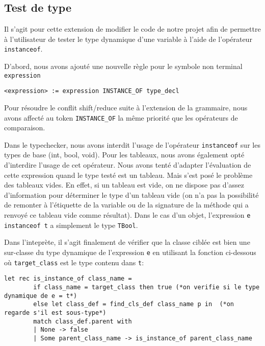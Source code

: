 \documentclass{article}
\begin{document}
\subsection{Test de type}
Il s'agit pour cette extension de modifier le code de notre projet afin 
de permettre à l'utilisateur de tester le type dynamique d'une variable à l'aide 
de l'opérateur \texttt{instanceof}.

D'abord, nous avons ajouté une nouvelle règle pour le symbole non terminal \texttt{expression}
\begin{lstlisting}[style=mystyle]
    <expression> := expression INSTANCE_OF type_decl    
\end{lstlisting}

Pour résoudre le conflit shift/reduce suite à l'extension de la grammaire,
nous avons affecté au token \texttt{INSTANCE\_OF} la même priorité que les 
opérateurs de comparaison. 

Dans le typechecker, nous avons interdit l'usage de l'opérateur \texttt{instanceof} sur les types de base (int, bool, void). Pour les tableaux, nous avons également opté d'interdire l'usage de cet opérateur. Nous avons tenté d'adapter l'évaluation de cette expression quand le type testé est un tableau. Mais s'est posé le problème des tableaux vides. En effet, si un tableau est vide, on ne dispose pas d'assez d'information pour déterminer le type d'un tableau vide (on n'a pas la possibilité de remonter à l'étiquette de la variable ou de la signature de la méthode qui a renvoyé ce tableau vide comme résultat). Dans le cas d'un objet, l'expression \texttt{e instanceof t} a simplement le type \texttt{TBool}.

Dans l'inteprète, il s'agit finalement de vérifier que la classe ciblée est bien une sur-classe du type dynamique de l'expression \texttt{e} en utilisant la fonction ci-dessous où \texttt{target\_class} est le type contenu dans \texttt{t}:

\begin{lstlisting}[style=mystyle, language=caml]
    let rec is_instance_of class_name = 
        if class_name = target_class then true (*on verifie si le type dynamique de e = t*)
        else let class_def = find_cls_def class_name p in  (*on regarde s'il est sous-type*)
        match class_def.parent with
        | None -> false 
        | Some parent_class_name -> is_instance_of parent_class_name
\end{lstlisting}
\end{document}
